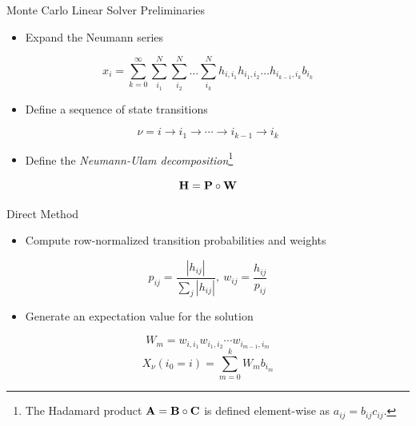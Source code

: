 \documentclass{beamer}
\begin{document}
\begin{frame}{Monte Carlo Linear Solver Preliminaries}

  \begin{itemize}
  \item Expand the Neumann series
  \end{itemize}

  \[
  x_i = \sum_{k=0}^{\infty}\sum_{i_1}^{N}\sum_{i_2}^{N}\ldots
  \sum_{i_k}^{N}h_{i,i_1}h_{i_1,i_2}\ldots h_{i_{k-1},i_k}b_{i_k}
  \]

  \medskip
  \begin{itemize}
  \item Define a sequence of state transitions
  \end{itemize}
  
  \[
  \nu = i \rightarrow i_1 \rightarrow \cdots \rightarrow i_{k-1}
  \rightarrow i_{k}
  \]

  \medskip
  \begin{itemize}
  \item Define the \textit{Neumann-Ulam decomposition}\footnote{The
    Hadamard product $\mathbf{A} = \mathbf{B} \circ \mathbf{C}$ is defined
    element-wise as $a_{ij} = b_{ij} c_{ij}$.}
  \end{itemize}

  \[
  \mathbf{H} = \mathbf{P} \circ \mathbf{W}
  \]

\end{frame}

\begin{frame}{Direct Method}

  \begin{itemize}
  \item Compute row-normalized transition probabilities and weights
  \end{itemize}

  \[
  p_{ij} = \frac{|h_{ij}|}{\sum_j |h_{ij}|},\ w_{ij} =
  \frac{h_{ij}}{p_{ij}}
  \]

  \medskip \medskip
  \begin{itemize}
  \item Generate an expectation value for the solution
  \end{itemize}

  \[
  W_{m} = w_{i,i_1} w_{i_1,i_2} \cdots w_{i_{m-1},i_m}
  \]
  \[
  X_{\nu}(i_0 = i) = \sum_{m=0}^k W_{m} b_{i_m}
  \]
\end{frame}
\end{document}

